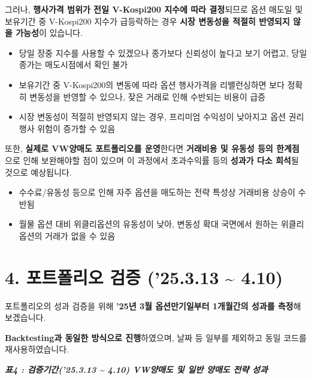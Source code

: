 \documentclass[
  a4paper,
  DIV=11,
  numbers=noendperiod]{scrreprt}
\providecommand{\tightlist}{%
  \setlength{\itemsep}{0pt}\setlength{\parskip}{0pt}}\usepackage{longtable,booktabs,array}
\begin{document}
그러나, \textbf{행사가격 범위가 전일 V-Kospi200 지수에 따라 결정}되므로
옵션 매도일 및 보유기간 중 V-Kospi200 지수가 급등락하는 경우
\textbf{시장 변동성을 적절히 반영되지 않을 가능성}이 있습니다.

\begin{itemize}
\tightlist
\item
  당일 장중 지수를 사용할 수 있겠으나 종가보다 신뢰성이 높다고 보기
  어렵고, 당일 종가는 매도시점에서 확인 불가
\item
  보유기간 중 V-Kospi200의 변동에 따라 옵션 행사가격을 리밸런싱하면 보다
  정확히 변동성을 반영할 수 있으나, 잦은 거래로 인해 수반되는 비용이
  급증
\item
  시장 변동성이 적절히 반영되지 않는 경우, 프리미엄 수익성이 낮아지고
  옵션 권리행사 위험이 증가할 수 있음
\end{itemize}

또한, \textbf{실제로 VW양매도 포트폴리오를 운영}한다면 \textbf{거래비용
및 유동성 등의 한계점}으로 인해 보완해야할 점이 있으며 이 과정에서
초과수익률 등의 \textbf{성과가 다소 희석}될 것으로 예상됩니다.

\begin{itemize}
\tightlist
\item
  수수료/유동성 등으로 인해 자주 옵션을 매도하는 전략 특성상 거래비용
  상승이 수반됨
\item
  월물 옵션 대비 위클리옵션의 유동성이 낮아, 변동성 확대 국면에서 원하는
  위클리옵션의 거래가 없을 수 있음
\end{itemize}

\section*{4. 포트폴리오 검증 ('25.3.13 \textasciitilde{}
4.10)}\label{uxd3ecuxd2b8uxd3f4uxb9acuxc624-uxac80uxc99d-25.3.13-4.10}


포트폴리오의 성과 검증을 위해 \textbf{'25년 3월 옵션만기일부터 1개월간의
성과를 측정}해보겠습니다.

\textbf{Backtesting과 동일한 방식으로 진행}하였으며, 날짜 등 일부를
제외하고 동일 코드를 재사용하였습니다.

\textbf{\emph{표4 : 검증기간('25.3.13 \textasciitilde{} 4.10) VW양매도
및 일반 양매도 전략 성과}}
\end{document}
